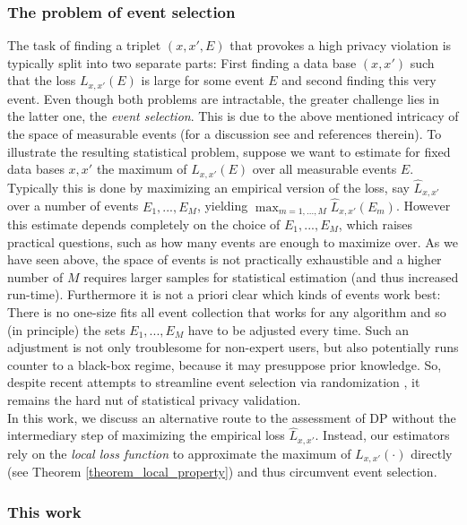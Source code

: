 \documentclass[conference]{IEEEtran}
\begin{document}
\subsubsection*{\textbf{The problem of event selection}}

The task of finding a triplet $(x,x',E)$ that provokes a high privacy violation is typically split into two separate parts: First finding a data base $(x,x')$ such that the loss $L_{x,x'}(E)$ is large for some event $E$ and second finding this very event. Even though both problems are intractable, the greater challenge lies in the latter one, the \textit{event selection}. This is due to the above mentioned intricacy of the space of measurable events (for a discussion see \cite{DP-Sniper} and references therein). To illustrate the resulting statistical problem, suppose we want to estimate for fixed data bases $x,x'$ the maximum of $L_{x,x'}(E)$ over all measurable events $E$.
Typically this is done by maximizing an empirical version of the loss, say $\hat L_{x,x'}$ over a number of events $E_1, ...,E_M$, yielding  $\max_{m=1,...,M}\hat L_{x,x'}(E_m) $. However this estimate depends completely on the choice of $E_1,...,E_M$, which raises practical questions, such as how many events are enough to maximize over. As we have seen above, the space of events is not practically exhaustible  and a higher number of $M$ requires larger samples for statistical estimation (and thus increased run-time). Furthermore it is not a priori clear which kinds of events work best: There is no one-size fits all event collection that works for any algorithm and so (in principle) the sets $E_1,...,E_M$ have to be adjusted every time. Such an adjustment is not only troublesome for non-expert users, but also potentially runs counter to a black-box regime, because it may presuppose prior knowledge. So, despite recent attempts to streamline event selection via randomization \cite{DP-Sniper}, it remains the hard nut of statistical privacy validation.\\
In this work, we discuss an alternative route to the assessment of DP without the intermediary step of maximizing the empirical loss $\hat L_{x,x'}$. Instead, our estimators rely on the  \textit{local loss function} to approximate the maximum of $L_{x,x'}(\cdot)$ directly (see Theorem \ref{theorem_local_property}) and thus circumvent event selection. 


\subsubsection*{\textbf{This work}}
\end{document}
